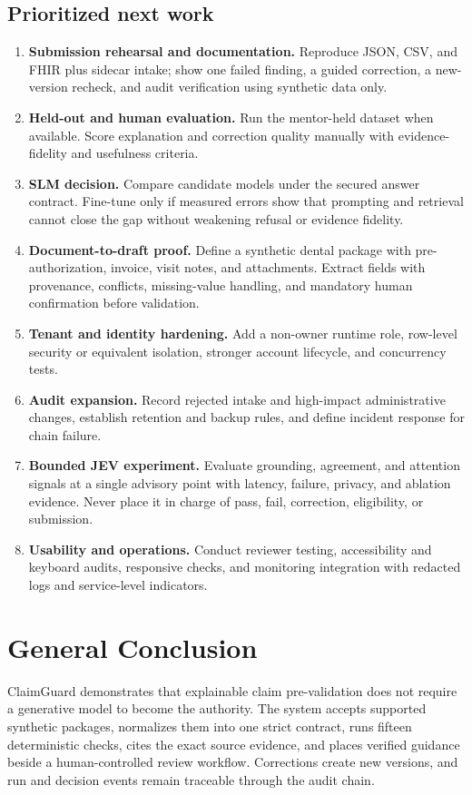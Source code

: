 \documentclass[11pt,a4paper,oneside]{report}
\begin{document}
\section{Prioritized next work}

\begin{enumerate}
  \item \textbf{Submission rehearsal and documentation.} Reproduce JSON, CSV, and FHIR plus sidecar intake; show one failed finding, a guided correction, a new-version recheck, and audit verification using synthetic data only.
  \item \textbf{Held-out and human evaluation.} Run the mentor-held dataset when available. Score explanation and correction quality manually with evidence-fidelity and usefulness criteria.
  \item \textbf{SLM decision.} Compare candidate models under the secured answer contract. Fine-tune only if measured errors show that prompting and retrieval cannot close the gap without weakening refusal or evidence fidelity.
  \item \textbf{Document-to-draft proof.} Define a synthetic dental package with pre-authorization, invoice, visit notes, and attachments. Extract fields with provenance, conflicts, missing-value handling, and mandatory human confirmation before validation.
  \item \textbf{Tenant and identity hardening.} Add a non-owner runtime role, row-level security or equivalent isolation, stronger account lifecycle, and concurrency tests.
  \item \textbf{Audit expansion.} Record rejected intake and high-impact administrative changes, establish retention and backup rules, and define incident response for chain failure.
  \item \textbf{Bounded JEV experiment.} Evaluate grounding, agreement, and attention signals at a single advisory point with latency, failure, privacy, and ablation evidence. Never place it in charge of pass, fail, correction, eligibility, or submission.
  \item \textbf{Usability and operations.} Conduct reviewer testing, accessibility and keyboard audits, responsive checks, and monitoring integration with redacted logs and service-level indicators.
\end{enumerate}
\endgroup

\chapter{General Conclusion}
ClaimGuard demonstrates that explainable claim pre-validation does not require a generative model to become the authority. The system accepts supported synthetic packages, normalizes them into one strict contract, runs fifteen deterministic checks, cites the exact source evidence, and places verified guidance beside a human-controlled review workflow. Corrections create new versions, and run and decision events remain traceable through the audit chain.
\end{document}
